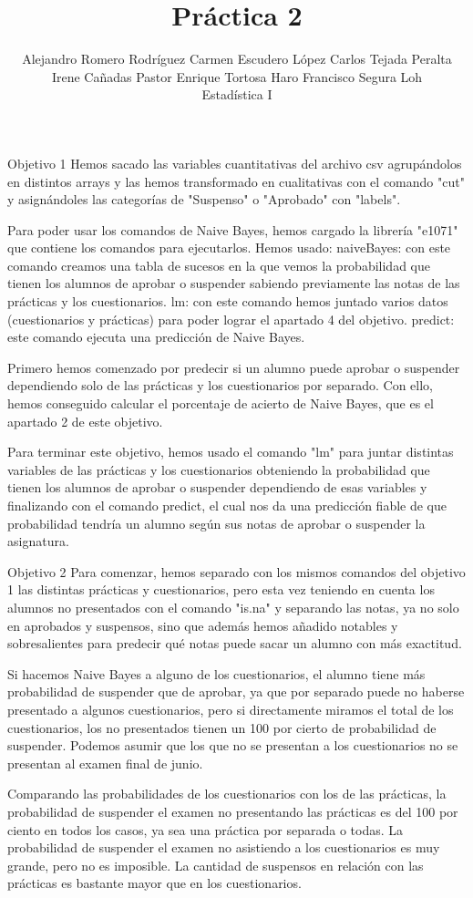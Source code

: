 \documentclass[12pt,a4paper,titlepage,twopages]{article}
\title{Práctica 2}
\author{Alejandro Romero Rodríguez Carmen Escudero López Carlos Tejada Peralta Irene Cañadas Pastor Enrique Tortosa Haro Francisco Segura Loh\\ \vspace{5mm} Estadística I}
\begin{document}
Objetivo 1
Hemos sacado las variables cuantitativas del archivo csv agrupándolos en distintos arrays y las hemos transformado en cualitativas con el comando "cut" y asignándoles las categorías de "Suspenso" o "Aprobado" con "labels".

Para poder usar los comandos de Naive Bayes, hemos cargado la librería "e1071" que contiene los comandos para ejecutarlos. Hemos usado:
naiveBayes: con este comando creamos una tabla de sucesos en la que vemos la probabilidad que tienen los alumnos de aprobar o suspender sabiendo previamente las notas de las prácticas y los cuestionarios.
lm: con este comando hemos juntado varios datos (cuestionarios y prácticas) para poder lograr el apartado 4 del objetivo.
predict: este comando ejecuta una predicción de Naive Bayes. 

Primero hemos comenzado por predecir si un alumno puede aprobar o suspender dependiendo solo de las prácticas y los cuestionarios por separado. Con ello, hemos conseguido calcular el porcentaje de acierto de Naive Bayes, que es el apartado 2 de este objetivo. 

Para terminar este objetivo, hemos usado el comando "lm" para juntar distintas variables de las prácticas y los cuestionarios obteniendo la probabilidad que tienen los alumnos de aprobar o suspender dependiendo de esas variables y finalizando con el comando predict, el cual nos da una predicción fiable de que probabilidad tendría un alumno según sus notas de aprobar o suspender la asignatura.

Objetivo 2
Para comenzar, hemos separado con los mismos comandos del objetivo 1 las distintas prácticas y cuestionarios, pero esta vez teniendo en cuenta los alumnos no presentados con el comando "is.na" y separando las notas, ya no solo en aprobados y suspensos, sino que además hemos añadido notables y sobresalientes para predecir qué notas puede sacar un alumno con más exactitud.

Si hacemos Naive Bayes a alguno de los cuestionarios, el alumno tiene más probabilidad de suspender que de aprobar, ya que por separado puede no haberse presentado a algunos cuestionarios, pero si directamente miramos el total de los cuestionarios, los no presentados tienen un 100 por cierto de probabilidad de suspender. Podemos asumir que los que no se presentan a los cuestionarios no se presentan al examen final de junio.

Comparando las probabilidades de los cuestionarios con los de las prácticas, la probabilidad de suspender el examen no presentando las prácticas es del 100 por ciento en todos los casos, ya sea una práctica por separada o todas. La probabilidad de suspender el examen no asistiendo a los cuestionarios es muy grande, pero no es imposible. La cantidad de suspensos en relación con las prácticas es bastante mayor que en los cuestionarios.
\end{document}
